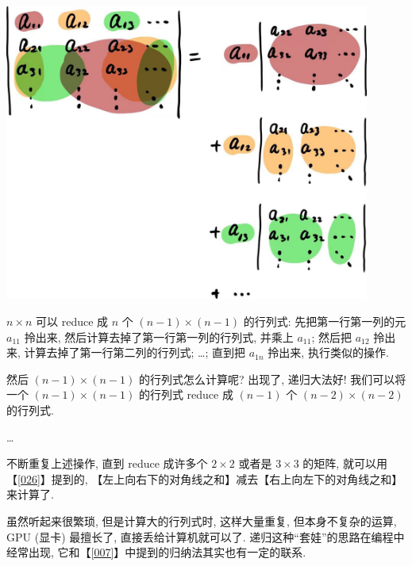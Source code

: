 \begin{tcolorbox}[size=fbox, breakable, enhanced jigsaw]
  \includegraphics[width=0.9\textwidth]{img/image-20240117150843442.png}
\end{tcolorbox}

$n\times n$ 可以 reduce 成 $n$ 个 $(n-1)\times(n-1)$ 的行列式:
先把第一行第一列的元 $a_{11}$ 拎出来,
然后计算去掉了第一行第一列的行列式, 并乘上 $a_{11}$; 然后把 $a_{12}$
拎出来, 计算去掉了第一行第二列的行列式; \ldots; 直到把 $a_{1n}$
拎出来, 执行类似的操作.

然后 $(n-1)\times(n-1)$ 的行列式怎么计算呢? 出现了, 递归大法好!
我们可以将一个 $(n-1)\times(n-1)$ 的行列式 reduce 成 $(n-1)$ 个
$(n-2)\times(n-2)$ 的行列式.

\ldots{}

不断重复上述操作, 直到 reduce 成许多个 $2\times2$ 或者是 $3\times3$
的矩阵, 就可以用【\ref{026}】提到的,
【左上向右下的对角线之和】减去【右上向左下的对角线之和】来计算了.

虽然听起来很繁琐, 但是计算大的行列式时, 这样大量重复,
但本身不复杂的运算, GPU (显卡) 最擅长了, 直接丢给计算机就可以了.
递归这种``套娃''的思路在编程中经常出现,
它和【\ref{007}】中提到的归纳法其实也有一定的联系.
